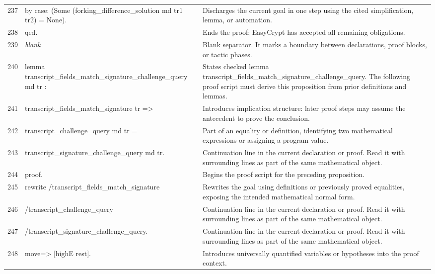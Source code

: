 \documentclass[10pt]{article}
\begin{document}
\begin{longtable}{r L{0.53\textwidth} L{0.37\textwidth}}
237 & {\ttfamily\scriptsize by case: (Some (forking\_difference\_solution md tr1 tr2) = None).} & Discharges the current goal in one step using the cited simplification, lemma, or automation. \\
238 & {\ttfamily\scriptsize qed.} & Ends the proof; EasyCrypt has accepted all remaining obligations. \\
239 & {\ttfamily\scriptsize \emph{blank}} & Blank separator.  It marks a boundary between declarations, proof blocks, or tactic phases. \\
240 & {\ttfamily\scriptsize lemma transcript\_fields\_match\_signature\_challenge\_query md tr :} & States checked lemma transcript\_fields\_match\_signature\_challenge\_query.  The following proof script must derive this proposition from prior definitions and lemmas. \\
241 & {\ttfamily\scriptsize   transcript\_fields\_match\_signature tr =>} & Introduces implication structure: later proof steps may assume the antecedent to prove the conclusion. \\
242 & {\ttfamily\scriptsize   transcript\_challenge\_query md tr =} & Part of an equality or definition, identifying two mathematical expressions or assigning a program value. \\
243 & {\ttfamily\scriptsize   transcript\_signature\_challenge\_query md tr.} & Continuation line in the current declaration or proof.  Read it with surrounding lines as part of the same mathematical object. \\
244 & {\ttfamily\scriptsize proof.} & Begins the proof script for the preceding proposition. \\
245 & {\ttfamily\scriptsize rewrite /transcript\_fields\_match\_signature} & Rewrites the goal using definitions or previously proved equalities, exposing the intended mathematical normal form. \\
246 & {\ttfamily\scriptsize         /transcript\_challenge\_query} & Continuation line in the current declaration or proof.  Read it with surrounding lines as part of the same mathematical object. \\
247 & {\ttfamily\scriptsize         /transcript\_signature\_challenge\_query.} & Continuation line in the current declaration or proof.  Read it with surrounding lines as part of the same mathematical object. \\
248 & {\ttfamily\scriptsize move=> [highE rest].} & Introduces universally quantified variables or hypotheses into the proof context. \\

\end{longtable}
\end{document}
